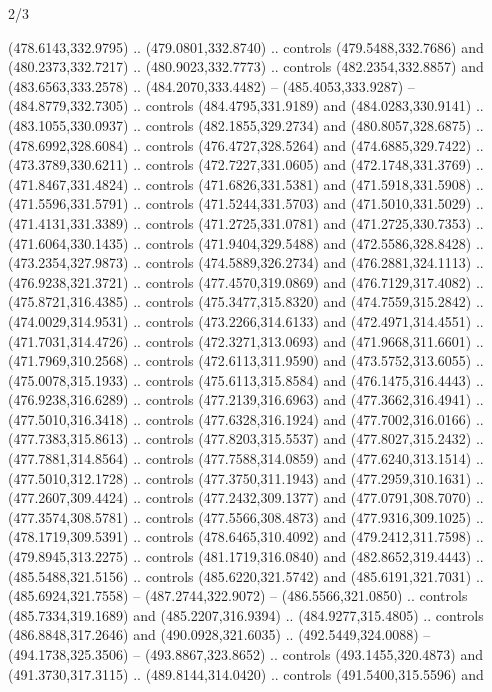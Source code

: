 \begin{flagdescription}{2/3}
\begin{scope}[xshift=0.5\flaglength,yshift=0.5\flagwidth,scale=\flagwidth/495.65]
\begin{scope}[y=0.8pt, x=0.8pt, yscale=-1,shift={(-463.76,-309.78)}]
  (478.6143,332.9795) .. (479.0801,332.8740) .. controls (479.5488,332.7686) and
  (480.2373,332.7217) .. (480.9023,332.7773) .. controls (482.2354,332.8857) and
  (483.6563,333.2578) .. (484.2070,333.4482) -- (485.4053,333.9287) --
  (484.8779,332.7305) .. controls (484.4795,331.9189) and (484.0283,330.9141) ..
  (483.1055,330.0937) .. controls (482.1855,329.2734) and (480.8057,328.6875) ..
  (478.6992,328.6084) .. controls (476.4727,328.5264) and (474.6885,329.7422) ..
  (473.3789,330.6211) .. controls (472.7227,331.0605) and (472.1748,331.3769) ..
  (471.8467,331.4824) .. controls (471.6826,331.5381) and (471.5918,331.5908) ..
  (471.5596,331.5791) .. controls (471.5244,331.5703) and (471.5010,331.5029) ..
  (471.4131,331.3389) .. controls (471.2725,331.0781) and (471.2725,330.7353) ..
  (471.6064,330.1435) .. controls (471.9404,329.5488) and (472.5586,328.8428) ..
  (473.2354,327.9873) .. controls (474.5889,326.2734) and (476.2881,324.1113) ..
  (476.9238,321.3721) .. controls (477.4570,319.0869) and (476.7129,317.4082) ..
  (475.8721,316.4385) .. controls (475.3477,315.8320) and (474.7559,315.2842) ..
  (474.0029,314.9531) .. controls (473.2266,314.6133) and (472.4971,314.4551) ..
  (471.7031,314.4726) .. controls (472.3271,313.0693) and (471.9668,311.6601) ..
  (471.7969,310.2568) .. controls (472.6113,311.9590) and (473.5752,313.6055) ..
  (475.0078,315.1933) .. controls (475.6113,315.8584) and (476.1475,316.4443) ..
  (476.9238,316.6289) .. controls (477.2139,316.6963) and (477.3662,316.4941) ..
  (477.5010,316.3418) .. controls (477.6328,316.1924) and (477.7002,316.0166) ..
  (477.7383,315.8613) .. controls (477.8203,315.5537) and (477.8027,315.2432) ..
  (477.7881,314.8564) .. controls (477.7588,314.0859) and (477.6240,313.1514) ..
  (477.5010,312.1728) .. controls (477.3750,311.1943) and (477.2959,310.1631) ..
  (477.2607,309.4424) .. controls (477.2432,309.1377) and (477.0791,308.7070) ..
  (477.3574,308.5781) .. controls (477.5566,308.4873) and (477.9316,309.1025) ..
  (478.1719,309.5391) .. controls (478.6465,310.4092) and (479.2412,311.7598) ..
  (479.8945,313.2275) .. controls (481.1719,316.0840) and (482.8652,319.4443) ..
  (485.5488,321.5156) .. controls (485.6220,321.5742) and (485.6191,321.7031) ..
  (485.6924,321.7558) -- (487.2744,322.9072) -- (486.5566,321.0850) .. controls
  (485.7334,319.1689) and (485.2207,316.9394) .. (484.9277,315.4805) .. controls
  (486.8848,317.2646) and (490.0928,321.6035) .. (492.5449,324.0088) --
  (494.1738,325.3506) -- (493.8867,323.8652) .. controls (493.1455,320.4873) and
  (491.3730,317.3115) .. (489.8144,314.0420) .. controls (491.5400,315.5596) and

\end{scope}
\end{scope}
\end{flagdescription}
